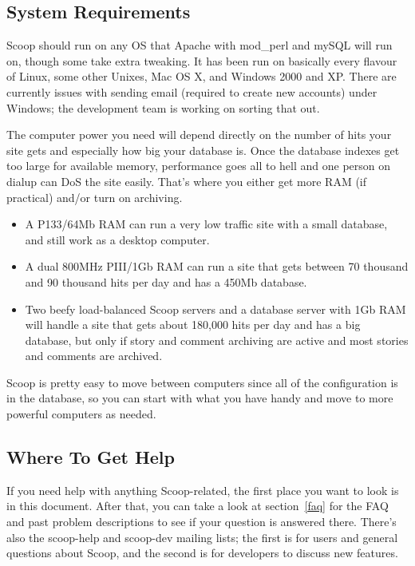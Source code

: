 \subsection{System Requirements}

Scoop should run on any OS that Apache with mod\_perl and mySQL will run on, though some take extra tweaking.  It has been run on basically every flavour of Linux, some other Unixes, Mac OS X, and Windows 2000 and XP.  There are currently issues with sending email (required to create new accounts) under Windows; the development team is working on sorting that out.

The computer power you need will depend directly on the number of hits your site gets and especially how big your database is.  Once the database indexes get too large for available memory, performance goes all to hell and one person on dialup can DoS the site easily.  That's where you either get more RAM (if practical) and/or turn on archiving.

\begin{itemize}
\item A P133/64Mb RAM can run a very low traffic site with a small database, and still work as a desktop computer.
\item A dual 800MHz PIII/1Gb RAM can run a site that gets between 70 thousand and 90 thousand hits per day and has a 450Mb database.
\item Two beefy load-balanced Scoop servers and a database server with 1Gb RAM will handle a site that gets about 180,000 hits per day and has a big database, but only if story and comment archiving are active and most stories and comments are archived.
\end{itemize}

Scoop is pretty easy to move between computers since all of the configuration is in the database, so you can start with what you have handy and move to more powerful computers as needed.

\subsection{Where To Get Help}
\label{get-help}

If you need help with anything Scoop-related, the first place you want to look is in this document.  After that, you can take a look at section~\ref{faq} for the FAQ and past problem descriptions to see if your question is answered there.  There's also the scoop-help and scoop-dev mailing lists; the first is for users and general questions about Scoop, and the second is for developers to discuss new features.

